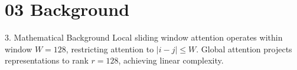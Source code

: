 \section{03 Background}

 3. Mathematical Background
Local sliding window attention operates within window $W=128$, restricting attention to $|i - j| \le W$. Global attention projects representations to rank $r=128$, achieving linear complexity.
